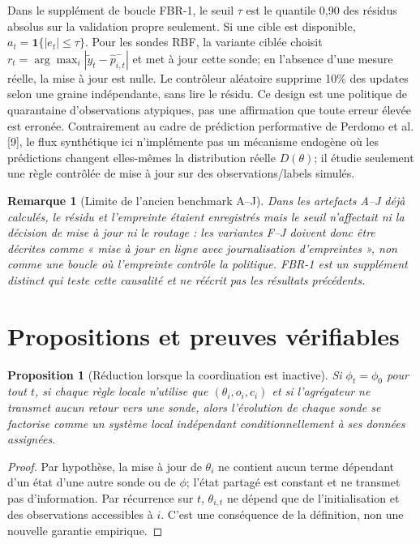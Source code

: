 \documentclass[11pt,a4paper]{article}
\newtheorem{proposition}[definition]{Proposition}
\newtheorem{remark}[definition]{Remarque}
\begin{document}
Dans le supplément de boucle FBR-1, le seuil $\tau$ est le quantile 0,90 des résidus absolus sur la validation propre seulement. Si une cible est disponible, $a_t=\mathbf1\{|e_t|\leq\tau\}$. Pour les sondes RBF, la variante ciblée choisit $r_t=\arg\max_i|\tilde y_t-\hat p_{i,t}^-|$ et met à jour cette sonde; en l'absence d'une mesure réelle, la mise à jour est nulle. Le contrôleur aléatoire supprime 10\% des updates selon une graine indépendante, sans lire le résidu. Ce design est une politique de quarantaine d'observations atypiques, pas une affirmation que toute erreur élevée est erronée. Contrairement au cadre de prédiction performative de Perdomo et al. [9], le flux synthétique ici n'implémente pas un mécanisme endogène où les prédictions changent elles-mêmes la distribution réelle $D(\theta)$; il étudie seulement une règle contrôlée de mise à jour sur des observations/labels simulés.

\begin{remark}[Limite de l'ancien benchmark A--J]
Dans les artefacts A--J déjà calculés, le résidu et l'empreinte étaient enregistrés mais le seuil n'affectait ni la décision de mise à jour ni le routage : les variantes F--J doivent donc être décrites comme « mise à jour en ligne avec journalisation d'empreintes », non comme une boucle où l'empreinte contrôle la politique. FBR-1 est un supplément distinct qui teste cette causalité et ne réécrit pas les résultats précédents.
\end{remark}

\section{Propositions et preuves vérifiables}
\begin{proposition}[Réduction lorsque la coordination est inactive]
Si $\phi_t=\phi_0$ pour tout $t$, si chaque règle locale n'utilise que $(\theta_i,o_i,c_i)$ et si l'agrégateur ne transmet aucun retour vers une sonde, alors l'évolution de chaque sonde se factorise comme un système local indépendant conditionnellement à ses données assignées.
\end{proposition}
\begin{proof}
Par hypothèse, la mise à jour de $\theta_i$ ne contient aucun terme dépendant d'un état d'une autre sonde ou de $\phi$; l'état partagé est constant et ne transmet pas d'information. Par récurrence sur $t$, $\theta_{i,t}$ ne dépend que de l'initialisation et des observations accessibles à $i$. C'est une conséquence de la définition, non une nouvelle garantie empirique.
\end{proof}
\end{document}
